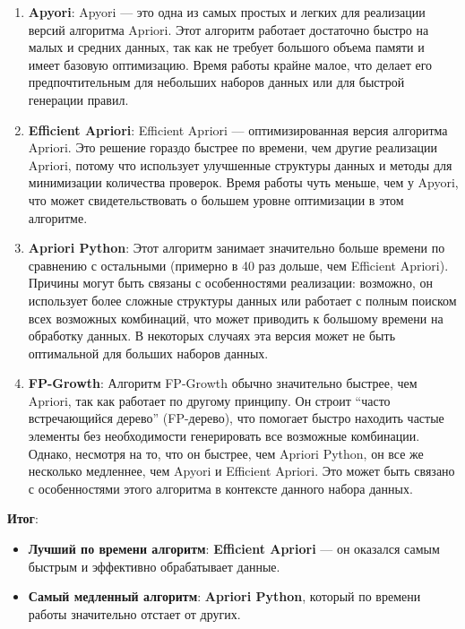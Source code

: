 \documentclass[14pt,a4paper,oneside]{extarticle}
\providecommand{\tightlist}{%
      \setlength{\itemsep}{0pt}\setlength{\parskip}{0pt}}
\begin{document}
\begin{enumerate}
\item
  \textbf{Apyori}: Apyori --- это одна из самых простых и легких для
  реализации версий алгоритма Apriori. Этот алгоритм работает достаточно
  быстро на малых и средних данных, так как не требует большого объема
  памяти и имеет базовую оптимизацию. Время работы крайне малое, что
  делает его предпочтительным для небольших наборов данных или для
  быстрой генерации правил.
\item
  \textbf{Efficient Apriori}: Efficient Apriori --- оптимизированная
  версия алгоритма Apriori. Это решение гораздо быстрее по времени, чем
  другие реализации Apriori, потому что использует улучшенные структуры
  данных и методы для минимизации количества проверок. Время работы чуть
  меньше, чем у Apyori, что может свидетельствовать о большем уровне
  оптимизации в этом алгоритме.
\item
  \textbf{Apriori Python}: Этот алгоритм занимает значительно больше
  времени по сравнению с остальными (примерно в 40 раз дольше, чем
  Efficient Apriori). Причины могут быть связаны с особенностями
  реализации: возможно, он использует более сложные структуры данных или
  работает с полным поиском всех возможных комбинаций, что может
  приводить к большому времени на обработку данных. В некоторых случаях
  эта версия может не быть оптимальной для больших наборов данных.
\item
  \textbf{FP-Growth}: Алгоритм FP-Growth обычно значительно быстрее, чем
  Apriori, так как работает по другому принципу. Он строит ``часто
  встречающийся дерево'' (FP-дерево), что помогает быстро находить
  частые элементы без необходимости генерировать все возможные
  комбинации. Однако, несмотря на то, что он быстрее, чем Apriori
  Python, он все же несколько медленнее, чем Apyori и Efficient Apriori.
  Это может быть связано с особенностями этого алгоритма в контексте
  данного набора данных.
\end{enumerate}

\textbf{Итог}:

\begin{itemize}
\tightlist
\item
  \textbf{Лучший по времени алгоритм}: \textbf{Efficient Apriori} --- он
  оказался самым быстрым и эффективно обрабатывает данные.
\item
  \textbf{Самый медленный алгоритм}: \textbf{Apriori Python}, который по
  времени работы значительно отстает от других.
\end{itemize}
\end{document}
